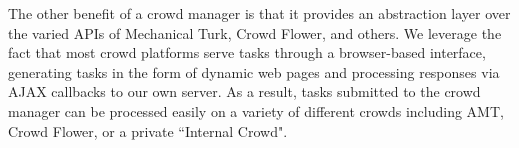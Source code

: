 The other benefit of a crowd manager is that it provides an abstraction layer over the varied APIs of Mechanical Turk, Crowd Flower, and others.
We leverage the fact that most crowd platforms serve tasks through a browser-based interface, generating tasks in the form of dynamic web pages and processing responses via AJAX callbacks to our own server.
As a result, tasks submitted to the crowd manager can be processed easily on a variety of different crowds including AMT, Crowd Flower, or a private ``Internal Crowd".